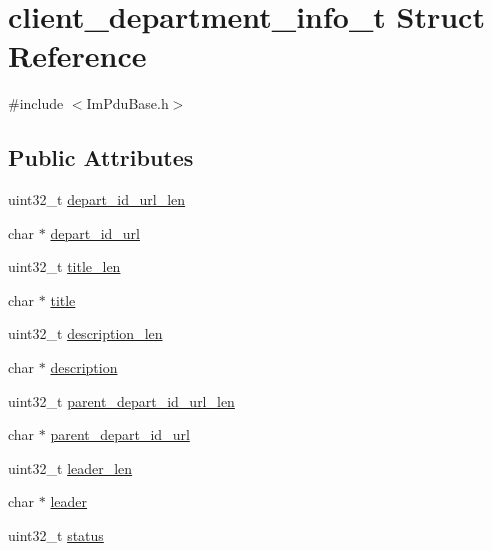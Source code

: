 \hypertarget{structclient__department__info__t}{}\section{client\+\_\+department\+\_\+info\+\_\+t Struct Reference}
\label{structclient__department__info__t}


{\ttfamily \#include $<$Im\+Pdu\+Base.\+h$>$}

\subsection*{Public Attributes}
\begin{DoxyCompactItemize}
\item 
uint32\+\_\+t \hyperlink{structclient__department__info__t_a306c85f925ba7536fcdda6185232b705}{depart\+\_\+id\+\_\+url\+\_\+len}
\item 
char $\ast$ \hyperlink{structclient__department__info__t_ac38cda2922f31b15e045b5c8dfcb2ccf}{depart\+\_\+id\+\_\+url}
\item 
uint32\+\_\+t \hyperlink{structclient__department__info__t_a8b903a5fbd17b83032585c51a61d1793}{title\+\_\+len}
\item 
char $\ast$ \hyperlink{structclient__department__info__t_aee87e5b3e41a36cb589d03a6dc59e147}{title}
\item 
uint32\+\_\+t \hyperlink{structclient__department__info__t_ad8b0f034faf632d3332fd9e82df4f817}{description\+\_\+len}
\item 
char $\ast$ \hyperlink{structclient__department__info__t_a20a504aa6789310d92cf9efdcc10c1a8}{description}
\item 
uint32\+\_\+t \hyperlink{structclient__department__info__t_a33a84ebbb6fae569c6d35561f2871959}{parent\+\_\+depart\+\_\+id\+\_\+url\+\_\+len}
\item 
char $\ast$ \hyperlink{structclient__department__info__t_a5421562dbc920348ef9e4c4fb2d4a314}{parent\+\_\+depart\+\_\+id\+\_\+url}
\item 
uint32\+\_\+t \hyperlink{structclient__department__info__t_a172d07c4ab0afc9eec08b25467f8d179}{leader\+\_\+len}
\item 
char $\ast$ \hyperlink{structclient__department__info__t_ab581dd746e5e119b91ab7963fe7fea0a}{leader}
\item 
uint32\+\_\+t \hyperlink{structclient__department__info__t_aa91a77620000841293f3a03a4cd944f8}{status}
\end{DoxyCompactItemize}


